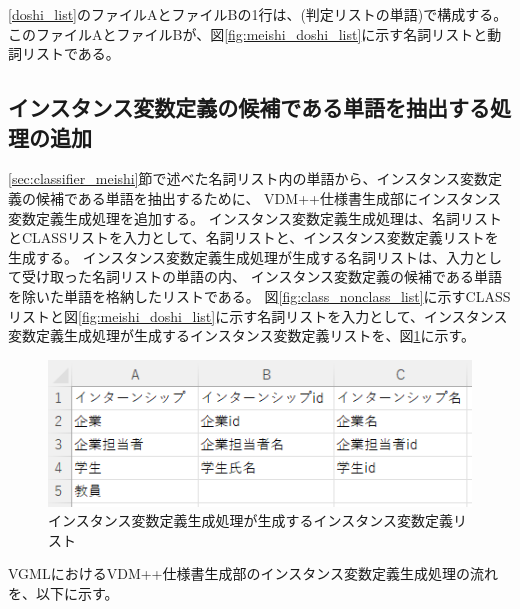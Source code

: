 \ref{doshi_list}のファイルAとファイルBの1行は、(判定リストの単語)で構成する。
このファイルAとファイルBが、図\ref{fig:meishi_doshi_list}に示す名詞リストと動詞リストである。

\subsection{インスタンス変数定義の候補である単語を抽出する処理の追加}
\ref{sec:classifier_meishi}節で述べた名詞リスト内の単語から、インスタンス変数定義の候補である単語を抽出するために、
VDM++仕様書生成部にインスタンス変数定義生成処理を追加する。
インスタンス変数定義生成処理は、名詞リストとCLASSリストを入力として、名詞リストと、インスタンス変数定義リストを生成する。
インスタンス変数定義生成処理が生成する名詞リストは、入力として受け取った名詞リストの単語の内、
インスタンス変数定義の候補である単語を除いた単語を格納したリストである。
図\ref{fig:class_nonclass_list}に示すCLASSリストと図\ref{fig:meishi_doshi_list}に示す名詞リストを入力として、インスタンス変数定義生成処理が生成するインスタンス変数定義リストを、図\ref{fig:instance_list}に示す。

\begin{figure}[t]
    \begin{center}
        \includegraphics[width=1.0\columnwidth]{image/instance_list.png}
        \caption{インスタンス変数定義生成処理が生成するインスタンス変数定義リスト}
        \label{fig:instance_list}
    \end{center}
\end{figure}

VGMLにおけるVDM++仕様書生成部のインスタンス変数定義生成処理の流れを、以下に示す。

